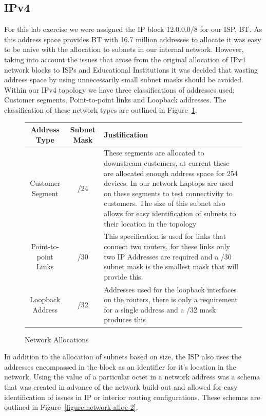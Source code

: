 \subsection{IPv4}
For this lab exercise we were assigned the IP block 12.0.0.0/8 for our ISP, BT.
As this address space provides BT with 16.7 million addresses to allocate it was
easy to be naive with the allocation to subnets in our internal network.
However, taking into account the issues that arose from the original allocation
of IPv4 network blocks to ISPs and Educational Institutions it was decided that
wasting address space by using unnecessarily small subnet masks should be
avoided. Within our IPv4 topology we have three classifications of addresses
used; Customer segments, Point-to-point links and Loopback addresses. The
classification of these network types are outlined in
Figure~\ref{figure:network-alloc-1}.

\begin{figure}[!ht]
	\caption{Network Allocations}
	\label{figure:network-alloc-1}
	\centering
	\begin{tabular}{|c|c|p{5.5cm}|}
		\hline \textbf{Address Type} & \textbf{Subnet Mask} & \textbf{Justification} \\
		\hline Customer Segment & /24 & These segments are allocated to downstream customers, at current these are allocated enough address space for 254 devices. In our network Laptops are used on these segments to test connectivity to customers. The size of this subnet also allows for easy identification of subnets to their location in the topology  \\
		\hline Point-to-point Links & /30 & This specification is used for links that connect two routers, for these links only two IP Addresses are required and a /30 subnet mask is the smallest mask that will provide this. \\
		\hline Loopback Address & /32 & Addresses used for the loopback interfaces on the routers, there is only a requirement for a single address and a /32 mask produces this \\
		\hline
	\end{tabular}
\end{figure}

In addition to the allocation of subnets based on size, the ISP also uses the
addresses encompassed in the block as an identifier for it's location in the
network. Using the value of a particular octet in a network address was a schema
that was created in advance of the network build-out and allowed for easy
identification of issues in IP or interior routing configurations. These schemas
are outlined in Figure~\ref{figure:network-alloc-2}.

